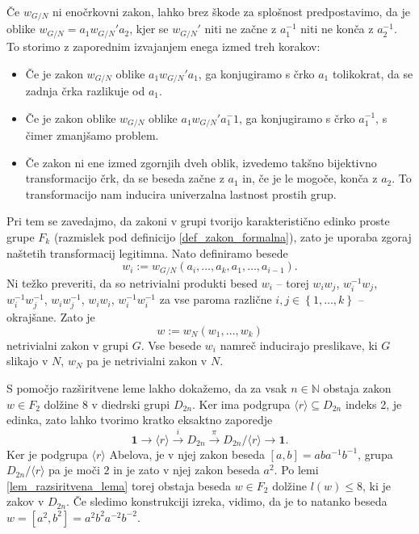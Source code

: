 \begin{dokaz}
        Če $w_{G / N}$ ni enočrkovni zakon, lahko brez škode za splošnost predpostavimo, da je oblike $w_{ G / N} = a_1 w_{ G / N}' a_2$, kjer se $w_{ G / N}'$ niti ne začne z $a_1^{-1}$ niti ne konča z $a_2^{-1}$.
        To storimo z zaporednim izvajanjem enega izmed treh korakov: \begin{itemize}
            \item Če je zakon $w_{ G / N}$ oblike $a_1 w_{ G / N}' a_1$, ga konjugiramo s črko $a_1$ tolikokrat, da se zadnja črka razlikuje od $a_1$.
            \item Če je zakon oblike $w_{ G / N}$ oblike $a_1 w_{ G / N}' a_1^-1$, ga konjugiramo s črko $a_1^{-1}$, s čimer zmanjšamo problem.
            \item Če zakon ni ene izmed zgornjih dveh oblik, izvedemo takšno bijektivno transformacijo črk, da se beseda začne z $a_1$ in, če je le mogoče, konča z $a_2$. To transformacijo nam inducira univerzalna lastnost prostih grup. 
        \end{itemize}
        Pri tem se zavedajmo, da zakoni v grupi tvorijo karakteristično edinko proste grupe $F_k$ (razmislek pod definicijo \ref{def_zakon_formalna}), zato je uporaba zgoraj naštetih transformacij legitimna. 
        Nato definiramo besede \begin{equation*}
   w_i := w_{ G / N}(a_{i}, \ldots, a_{k}, a_1, \ldots, a_{i - 1}).
   \end{equation*}  
   Ni težko preveriti, da so netrivialni produkti besed $w_i$ -- torej $w_{i} w_{j}$, $w_{i}^{-1} w_{j}$, \\ 
   $w_{i}^{-1} w_{j}^{-1}$,  $w_{i} w_{j}^{-1}$, $w_{i} w_{i}$, $w_{i}^{-1} w_{i}^{-1}$ za vse paroma različne $i,j \in \left\{ 1, \ldots, k \right\}$ -- okrajšane.
   Zato je \begin{equation*}
    w := w_N (w_1, \ldots, w_{k})
    \end{equation*}  
    netrivialni zakon v grupi $G$. Vse besede $w_{i}$ namreč inducirajo preslikave, ki $G$ slikajo v $N$, $w_N$ pa je netrivialni zakon v $N$.       
\end{dokaz}

\begin{primer}
    S pomočjo razširitvene leme lakho dokažemo, da za vsak $n \in \mathbb{N}$ obstaja zakon $w \in F_2$ dolžine $8$ v diedrski grupi $D_{2n}$. Ker ima podgrupa $\langle r \rangle \subseteq D_{2n}$ indeks 2, je edinka,
    zato lahko tvorimo kratko eksaktno zaporedje \begin{equation*}
        \mathbf{1} \to \langle r \rangle  \xrightarrow{i} D_{2n} \xrightarrow{\pi} D_{2n} / \langle r \rangle  \to \mathbf{1}.
        \end{equation*}
        Ker je podgrupa $\langle r \rangle$ Abelova, je v njej zakon beseda $[a, b] = aba^{-1} b^{-1}$, grupa $D_{2n} / \langle r \rangle$ pa je moči $2$ in je zato v njej zakon beseda $a^2$. Po lemi \ref{lem_razsiritvena_lema} torej obstaja beseda $w \in F_2$ dolžine $l(w) \le  8$, ki je zakov v $D_{2n}$.
        Če sledimo konstrukciji izreka, vidimo, da je to natanko beseda $w = [a^2, b^2] = a^2 b^2 a^{-2} b^{-2}$.   
\end{primer}

